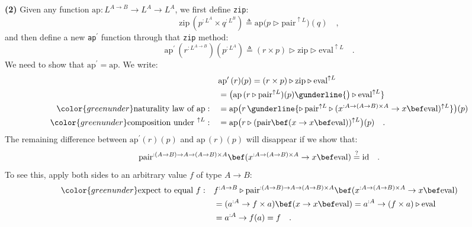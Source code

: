 \textbf{(2)} Given any function $\text{ap}:L^{A\rightarrow B}\rightarrow L^{A}\rightarrow L^{A}$,
we first define \lstinline!zip!:
\[
\text{zip}\,(p^{:L^{A}}\times q^{:L^{B}})\triangleq\text{ap}\big(p\triangleright\text{pair}^{\uparrow L}\big)(q)\quad,
\]
and then define a new \lstinline!ap!$^{\prime}$ function through
that \lstinline!zip! method:
\[
\text{ap}^{\prime}\,(r^{:L^{A\rightarrow B}})(p^{:L^{A}})\triangleq(r\times p)\triangleright\text{zip}\triangleright\text{eval}^{\uparrow L}\quad.
\]
We need to show that $\text{ap}^{\prime}=\text{ap}$. We write:
\begin{align*}
 & \text{ap}^{\prime}\,(r)(p)=(r\times p)\triangleright\text{zip}\triangleright\text{eval}^{\uparrow L}\\
 & =\big(\text{ap}\,(r\triangleright\text{pair}^{\uparrow L})(p)\gunderline{\big)\triangleright\text{eval}^{\uparrow L}}\\
{\color{greenunder}\text{naturality law of }\text{ap}:}\quad & =\text{ap}\big(r\,\gunderline{\triangleright\,\text{pair}^{\uparrow L}\triangleright(x^{:A\rightarrow\left(A\rightarrow B\right)\times A}\rightarrow x\bef\text{eval})^{\uparrow L}}\big)(p)\\
{\color{greenunder}\text{composition under }^{\uparrow L}:}\quad & =\text{ap}\big(r\triangleright(\text{pair}\bef(x\rightarrow x\bef\text{eval}))^{\uparrow L}\big)(p)\quad.
\end{align*}
The remaining difference between $\text{ap}^{\prime}(r)(p)$ and $\text{ap}\,(r)(p)$
will disappear if we show that: 
\[
\text{pair}^{:\left(A\rightarrow B\right)\rightarrow A\rightarrow\left(A\rightarrow B\right)\times A}\bef(x^{:A\rightarrow\left(A\rightarrow B\right)\times A}\rightarrow x\bef\text{eval})\overset{?}{=}\text{id}\quad.
\]
To see this, apply both sides to an arbitrary value $f$ of type $A\rightarrow B$:
\begin{align*}
{\color{greenunder}\text{expect to equal }f:}\quad & f^{:A\rightarrow B}\triangleright\text{pair}^{:\left(A\rightarrow B\right)\rightarrow A\rightarrow\left(A\rightarrow B\right)\times A}\bef(x^{:A\rightarrow\left(A\rightarrow B\right)\times A}\rightarrow x\bef\text{eval})\\
 & =(a^{:A}\rightarrow f\times a)\bef(x\rightarrow x\bef\text{eval})=a^{:A}\rightarrow(f\times a)\triangleright\text{eval}\\
 & =a^{:A}\rightarrow f(a)=f\quad.
\end{align*}

